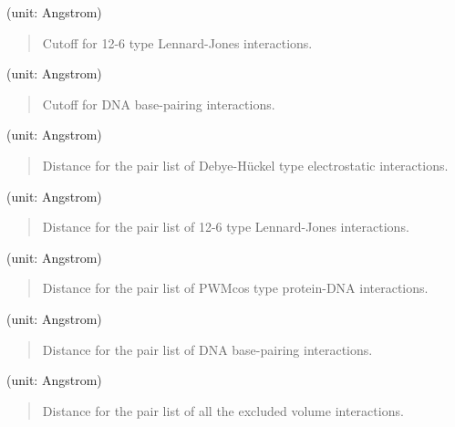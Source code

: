 \documentclass[a4paper,11pt,oneside,english]{sphinxmanual}
\begin{document}
  (unit: Angstrom)
\begin{quote}


Cutoff for 12-6 type Lennard-Jones interactions.
\end{quote}

  (unit: Angstrom)
\begin{quote}


Cutoff for DNA base-pairing interactions.
\end{quote}

  (unit: Angstrom)
\begin{quote}


Distance for the pair list of Debye-Hückel type electrostatic interactions.
\end{quote}

  (unit: Angstrom)
\begin{quote}


Distance for the pair list of 12-6 type Lennard-Jones interactions.
\end{quote}

  (unit: Angstrom)
\begin{quote}


Distance for the pair list of PWMcos type protein-DNA interactions.
\end{quote}

  (unit: Angstrom)
\begin{quote}


Distance for the pair list of DNA base-pairing interactions.
\end{quote}

  (unit: Angstrom)
\begin{quote}


Distance for the pair list of all the excluded volume interactions.
\end{quote}
\end{document}
